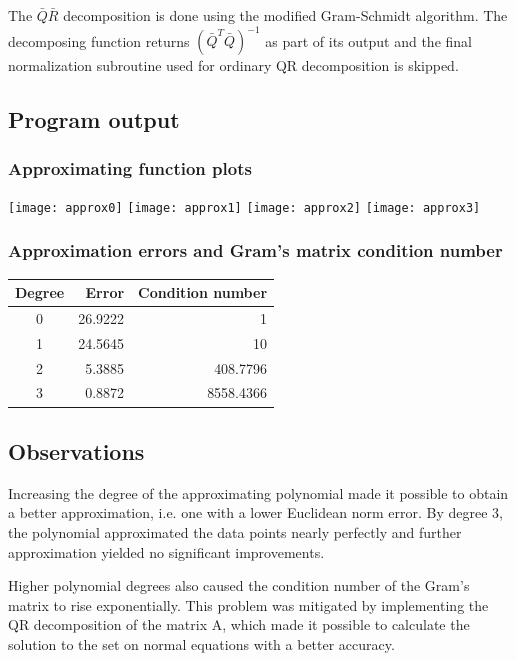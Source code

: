 \documentclass{article}
\begin{document}
	The $\bar{Q}\bar{R}$ decomposition is done using the modified
	Gram-Schmidt algorithm. The decomposing function returns
	$(\bar{Q}^T\bar{Q})^{-1}$ as part of its output and the final
	normalization subroutine used for ordinary QR decomposition is skipped.
	
	\subsection{Program output}
	
	\subsubsection{Approximating function plots}
	
	\texttt{[image: approx0]}
	\texttt{[image: approx1]}
	\texttt{[image: approx2]}
	\texttt{[image: approx3]}
	
	\subsubsection{Approximation errors and Gram's matrix condition number}
	
	\begin{center}
		\begin{tabular}{|c|r|r|} 
			\hline
			Degree & Error & Condition number \\
			\hline
			0 & 26.9222 & 1 \\
			1 & 24.5645 & 10 \\
			2 & 5.3885 & 408.7796 \\
			3 & 0.8872 & 8558.4366 \\
			\hline
		\end{tabular}
	\end{center}
	
	\subsection{Observations}
	
	Increasing the degree of the approximating polynomial made it possible
	to obtain a better approximation, i.e. one with a lower Euclidean norm
	error. By degree 3, the polynomial approximated the data points nearly
	perfectly and further approximation yielded no significant improvements.
	
	Higher polynomial degrees also caused the condition number of the Gram's
	matrix to rise exponentially. This problem was mitigated by implementing
	the QR decomposition of the matrix A, which made it possible to
	calculate the solution to the set on normal equations with a better
	accuracy.
	
\end{document}
